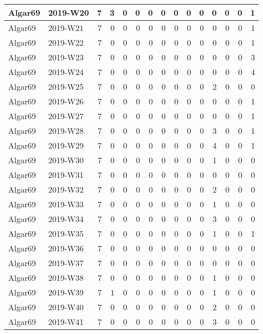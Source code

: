 \documentclass[]{book}
\begin{document}
\begin{table}
\begin{tabular}[t]{l|l|r|r|r|r|r|r|r|r|r|r|r|r|r}
\hline
Algar69 & 2019-W20 & 7 & 3 & 0 & 0 & 0 & 0 & 0 & 0 & 0 & 0 & 0 & 0 & 1\\
\hline
Algar69 & 2019-W21 & 7 & 0 & 0 & 0 & 0 & 0 & 0 & 0 & 0 & 0 & 0 & 0 & 1\\
\hline
Algar69 & 2019-W22 & 7 & 0 & 0 & 0 & 0 & 0 & 0 & 0 & 0 & 0 & 0 & 0 & 1\\
\hline
Algar69 & 2019-W23 & 7 & 0 & 0 & 0 & 0 & 0 & 0 & 0 & 0 & 0 & 0 & 0 & 3\\
\hline
Algar69 & 2019-W24 & 7 & 0 & 0 & 0 & 0 & 0 & 0 & 0 & 0 & 0 & 0 & 0 & 4\\
\hline
Algar69 & 2019-W25 & 7 & 0 & 0 & 0 & 0 & 0 & 0 & 0 & 0 & 2 & 0 & 0 & 0\\
\hline
Algar69 & 2019-W26 & 7 & 0 & 0 & 0 & 0 & 0 & 0 & 0 & 0 & 0 & 0 & 0 & 1\\
\hline
Algar69 & 2019-W27 & 7 & 0 & 0 & 0 & 0 & 0 & 0 & 0 & 0 & 0 & 0 & 0 & 1\\
\hline
Algar69 & 2019-W28 & 7 & 0 & 0 & 0 & 0 & 0 & 0 & 0 & 0 & 3 & 0 & 0 & 1\\
\hline
Algar69 & 2019-W29 & 7 & 0 & 0 & 0 & 0 & 0 & 0 & 0 & 0 & 4 & 0 & 0 & 1\\
\hline
Algar69 & 2019-W30 & 7 & 0 & 0 & 0 & 0 & 0 & 0 & 0 & 0 & 1 & 0 & 0 & 0\\
\hline
Algar69 & 2019-W31 & 7 & 0 & 0 & 0 & 0 & 0 & 0 & 0 & 0 & 0 & 0 & 0 & 0\\
\hline
Algar69 & 2019-W32 & 7 & 0 & 0 & 0 & 0 & 0 & 0 & 0 & 0 & 2 & 0 & 0 & 0\\
\hline
Algar69 & 2019-W33 & 7 & 0 & 0 & 0 & 0 & 0 & 0 & 0 & 0 & 1 & 0 & 0 & 0\\
\hline
Algar69 & 2019-W34 & 7 & 0 & 0 & 0 & 0 & 0 & 0 & 0 & 0 & 3 & 0 & 0 & 0\\
\hline
Algar69 & 2019-W35 & 7 & 0 & 0 & 0 & 0 & 0 & 0 & 0 & 0 & 1 & 0 & 0 & 1\\
\hline
Algar69 & 2019-W36 & 7 & 0 & 0 & 0 & 0 & 0 & 0 & 0 & 0 & 0 & 0 & 0 & 0\\
\hline
Algar69 & 2019-W37 & 7 & 0 & 0 & 0 & 0 & 0 & 0 & 0 & 0 & 0 & 0 & 0 & 0\\
\hline
Algar69 & 2019-W38 & 7 & 0 & 0 & 0 & 0 & 0 & 0 & 0 & 0 & 1 & 0 & 0 & 0\\
\hline
Algar69 & 2019-W39 & 7 & 1 & 0 & 0 & 0 & 0 & 0 & 0 & 0 & 1 & 0 & 0 & 0\\
\hline
Algar69 & 2019-W40 & 7 & 0 & 0 & 0 & 0 & 0 & 0 & 0 & 0 & 2 & 0 & 0 & 0\\
\hline
Algar69 & 2019-W41 & 7 & 0 & 0 & 0 & 0 & 0 & 0 & 0 & 0 & 3 & 0 & 0 & 0\\

\end{tabular}
\end{table}
\end{document}
